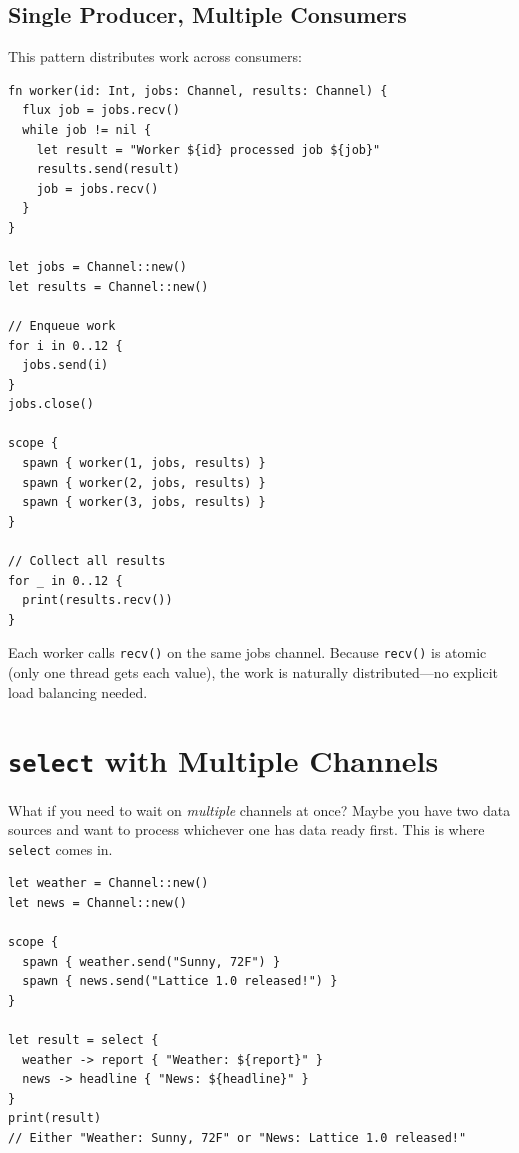 \subsection{Single Producer, Multiple Consumers}

This pattern distributes work across consumers:

\begin{lstlisting}[language=Lattice, caption={Work distribution across consumers}]
fn worker(id: Int, jobs: Channel, results: Channel) {
  flux job = jobs.recv()
  while job != nil {
    let result = "Worker ${id} processed job ${job}"
    results.send(result)
    job = jobs.recv()
  }
}

let jobs = Channel::new()
let results = Channel::new()

// Enqueue work
for i in 0..12 {
  jobs.send(i)
}
jobs.close()

scope {
  spawn { worker(1, jobs, results) }
  spawn { worker(2, jobs, results) }
  spawn { worker(3, jobs, results) }
}

// Collect all results
for _ in 0..12 {
  print(results.recv())
}
\end{lstlisting}

Each worker calls \lstinline|recv()| on the same jobs channel.
Because \lstinline|recv()| is atomic (only one thread gets each value), the work is naturally distributed---no explicit load balancing needed.

\section{\texttt{select} with Multiple Channels}\label{sec:select-channels}


What if you need to wait on \emph{multiple} channels at once?
Maybe you have two data sources and want to process whichever one has data ready first.
This is where \lstinline|select| comes in.

\begin{lstlisting}[language=Lattice, caption={Basic select}]
let weather = Channel::new()
let news = Channel::new()

scope {
  spawn { weather.send("Sunny, 72F") }
  spawn { news.send("Lattice 1.0 released!") }
}

let result = select {
  weather -> report { "Weather: ${report}" }
  news -> headline { "News: ${headline}" }
}
print(result)
// Either "Weather: Sunny, 72F" or "News: Lattice 1.0 released!"
\end{lstlisting}

